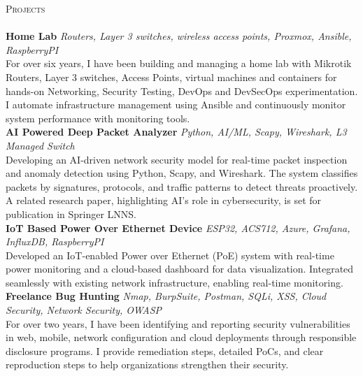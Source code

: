 \documentclass[a4paper]{article}
\newcommand{\lineunder} {
    \vspace*{-8pt} \\
    \hspace*{-18pt} \hrulefill \\
}
\newcommand{\header} [1] {
    {\hspace*{-18pt}\vspace*{6pt} \textsc{#1}}
    \vspace*{-6pt} \lineunder
}
\begin{document}
\header{Projects}
{\textbf{Home Lab}} {\sl Routers, Layer 3 switches, wireless access points, Proxmox, Ansible, RaspberryPI} \\
For over six years, I have been building and managing a home lab with Mikrotik Routers, Layer 3 switches, Access Points, virtual machines and containers for hands-on Networking, Security Testing, DevOps and DevSecOps experimentation. I automate infrastructure management using Ansible and continuously monitor system performance with monitoring tools.\\
\vspace*{2mm}
{\textbf{AI Powered Deep Packet Analyzer}} {\sl Python, AI/ML, Scapy, Wireshark, L3 Managed Switch} \\
Developing an AI-driven network security model for real-time packet inspection and anomaly detection using Python, Scapy, and Wireshark. The system classifies packets by signatures, protocols, and traffic patterns to detect threats proactively. A related research paper, highlighting AI’s role in cybersecurity, is set for publication in Springer LNNS.\\
\vspace*{2mm}
{\textbf{IoT Based Power Over Ethernet Device}} {\sl ESP32, ACS712, Azure, Grafana, InfluxDB, RaspberryPI} \\
Developed an IoT-enabled Power over Ethernet (PoE) system with real-time power monitoring and a cloud-based dashboard for data visualization. Integrated seamlessly with existing network infrastructure, enabling real-time monitoring.\\
\vspace*{2mm}
{\textbf{Freelance Bug Hunting}} {\sl Nmap, BurpSuite, Postman, SQLi, XSS, Cloud Security, Network Security, OWASP} \\
For over two years, I have been identifying and reporting security vulnerabilities in web, mobile, network configuration and cloud deployments through responsible disclosure programs. I provide remediation steps, detailed PoCs, and clear reproduction steps to help organizations strengthen their security.\\
\vspace*{2mm}



\ 
\end{document}
